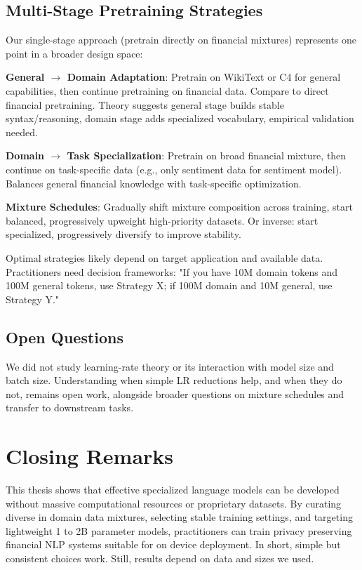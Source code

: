 \subsection{Multi-Stage Pretraining Strategies}

Our single-stage approach (pretrain directly on financial mixtures) represents one point in a broader design space:

\textbf{General $\rightarrow$ Domain Adaptation}: Pretrain on WikiText or C4 for general capabilities, then continue pretraining on financial data. Compare to direct financial pretraining. Theory suggests general stage builds stable syntax/reasoning, domain stage adds specialized vocabulary, empirical validation needed.

\textbf{Domain $\rightarrow$ Task Specialization}: Pretrain on broad financial mixture, then continue on task-specific data (e.g., only sentiment data for sentiment model). Balances general financial knowledge with task-specific optimization.

\textbf{Mixture Schedules}: Gradually shift mixture composition across training, start balanced, progressively upweight high-priority datasets. Or inverse: start specialized, progressively diversify to improve stability.

Optimal strategies likely depend on target application and available data. Practitioners need decision frameworks: "If you have 10M domain tokens and 100M general tokens, use Strategy X; if 100M domain and 10M general, use Strategy Y."

\subsection{Open Questions}

We did not study learning-rate theory or its interaction with model size and batch size. Understanding when simple LR reductions help, and when they do not, remains open work, alongside broader questions on mixture schedules and transfer to downstream tasks.

\section{Closing Remarks}

This thesis shows that effective specialized language models can be developed without massive computational resources or proprietary datasets. By curating diverse in domain data mixtures, selecting stable training settings, and targeting lightweight 1 to 2B parameter models, practitioners can train privacy preserving financial NLP systems suitable for on device deployment. In short, simple but consistent choices work. Still, results depend on data and sizes we used.

